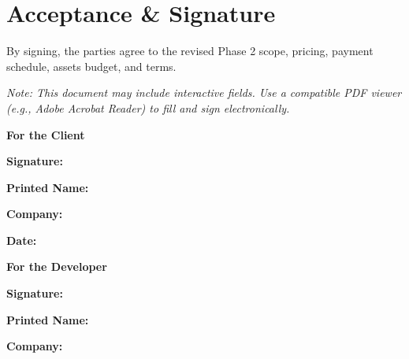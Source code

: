 \documentclass[11pt, a4paper]{article}
\begin{document}
\section*{Acceptance \& Signature}
By signing, the parties agree to the revised Phase 2 scope, pricing, payment schedule, assets budget, and terms.

\bigskip
\textit{Note: This document may include interactive fields. Use a compatible PDF viewer (e.g., Adobe Acrobat Reader) to fill and sign electronically.}
\bigskip

\begin{Form}
\noindent
\begin{minipage}[t]{0.48\textwidth}
    {\large\bfseries For the Client}\par\bigskip
    \textbf{Signature:}\\[5pt]
    \TextField[name=client_signature,width=\linewidth,height=1.8cm,bordercolor={0.7 0.7 0.7}]{}
    \vspace{0.5cm}

    \textbf{Printed Name:}\\[5pt]
    \TextField[name=client_name,width=\linewidth,value={Mr. Ali Mohammadi}]{}
    \vspace{0.5cm}

    \textbf{Company:}\\[5pt]
    \TextField[name=client_company,width=\linewidth,value={Currency Exchange SAADAT},readonly=true]{}
    \vspace{0.5cm}

    \textbf{Date:}\\[5pt]
    \TextField[name=client_date,width=4.5cm]{}
\end{minipage}
\hfill
\begin{minipage}[t]{0.48\textwidth}
    {\large\bfseries For the Developer}\par\bigskip
    \textbf{Signature:}\\[5pt]
    \TextField[name=developer_signature,width=\linewidth,height=1.8cm,bordercolor={0.7 0.7 0.7}]{}
    \vspace{0.5cm}

    \textbf{Printed Name:}\\[5pt]
    \TextField[name=developer_name,width=\linewidth]{}
    \vspace{0.5cm}

    \textbf{Company:}\\[5pt]
    \TextField[name=developer_company,width=\linewidth,value={Hypervelocity Capital\texttrademark},readonly=true]{}
    \vspace{0.5cm}


\end{minipage}
\end{Form}
\end{document}
